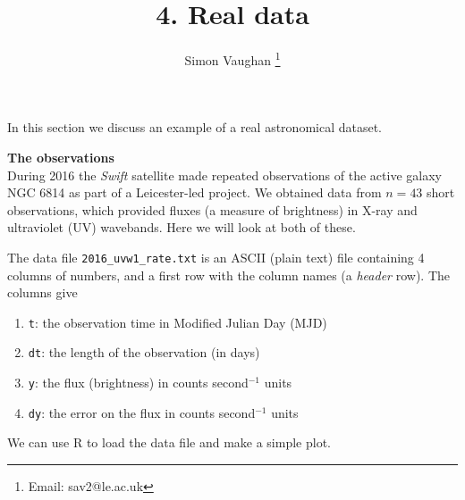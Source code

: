 \documentclass[a4paper, 11pt, amsmath, graphicx]{article}\usepackage[]{graphicx}\usepackage[]{color}
\begin{document}
\title{4. Real data}
\author{Simon Vaughan \thanks{Email: sav2@le.ac.uk}}
\maketitle

In this section we discuss an example of a real astronomical dataset.

\vspace{0.4cm}
\textbf{The observations}
\\

During 2016 the \emph{Swift} satellite made repeated observations of the active galaxy NGC 6814 as part of a Leicester-led project. We obtained data from $n = 43$ short observations, which provided fluxes (a measure of brightness) in X-ray and ultraviolet (UV) wavebands. Here we will look at both of these.

The data file {\tt 2016\_uvw1\_rate.txt} is an ASCII (plain text) file containing 4 columns of numbers, and a first row with the column names (a \emph{header} row). The columns give
\begin{enumerate}
\item {\tt t}: the observation time in Modified Julian Day (MJD)
\item {\tt dt}: the length of the observation (in days)
\item {\tt y}: the flux (brightness) in counts second$^{-1}$ units
\item {\tt dy}: the error on the flux in counts second$^{-1}$ units
\end{enumerate}

We can use R to load the data file and make a simple plot.
\end{document}
